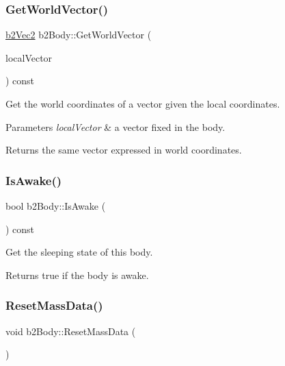 \subsubsection{\texorpdfstring{Get\+World\+Vector()}{GetWorldVector()}}
{\footnotesize\ttfamily \mbox{\hyperlink{structb2Vec2}{b2\+Vec2}} b2\+Body\+::\+Get\+World\+Vector (\begin{DoxyParamCaption}\item[{const \mbox{\hyperlink{structb2Vec2}{b2\+Vec2}} \&}]{local\+Vector }\end{DoxyParamCaption}) const\hspace{0.3cm}{\ttfamily [inline]}}

Get the world coordinates of a vector given the local coordinates. 
\begin{DoxyParams}{Parameters}
{\em local\+Vector} & a vector fixed in the body. \\
\hline
\end{DoxyParams}
\begin{DoxyReturn}{Returns}
the same vector expressed in world coordinates. 
\end{DoxyReturn}
\mbox{\label{classb2Body_a697f708427cdf7d31a626e80e694682c}} 
\subsubsection{\texorpdfstring{Is\+Awake()}{IsAwake()}}
{\footnotesize\ttfamily bool b2\+Body\+::\+Is\+Awake (\begin{DoxyParamCaption}{ }\end{DoxyParamCaption}) const\hspace{0.3cm}{\ttfamily [inline]}}

Get the sleeping state of this body. \begin{DoxyReturn}{Returns}
true if the body is awake. 
\end{DoxyReturn}
\mbox{\label{classb2Body_a109d8567c6ae84c61fce2919fb209c63}} 
\subsubsection{\texorpdfstring{Reset\+Mass\+Data()}{ResetMassData()}}
{\footnotesize\ttfamily void b2\+Body\+::\+Reset\+Mass\+Data (\begin{DoxyParamCaption}{ }\end{DoxyParamCaption})}

